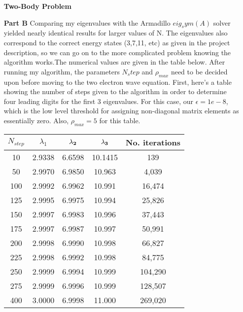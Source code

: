 \documentclass[11pt,a4wide]{article}
\begin{document}
\newpage
\begin{enumerate}
\item[\bf Two-Body Problem]

\item[\bf Part B]
Comparing my eigenvalues with the Armadillo $eig_sym(A)$ solver yielded nearly identical results for larger values of N. The eigenvalues also correspond to the correct energy states (3,7,11, etc) as given in the project description, so we can go on to the more complicated problem knowing the algorithm works.The numerical values are given in the table below. \newline
After running my algorithm, the parameters $N_step$ and $\rho_{max}$ need to be decided upon before moving to the two electron wave equation. First, here's a table showing the number of steps given to the algorithm in order to determine four leading digits for the first 3 eigenvalues. For this case, our $\epsilon = 1e-8$, which is the low level threshold for assigning non-diagonal matrix elements as essentially zero. Also, $\rho_{max} = 5$ for this table.  
\begin{center}
    \begin{tabular}{| c | c | c | c | c |}
    \hline
    \bf$ N_{step}$	& \bf $\lambda_{1}$	 & $\bf \lambda_{2}$	 & $\bf \lambda_{3}$	 & 	\bf No. iterations \\ \hline
	10 & 2.9338	 & 6.6598 &  10.1415 & 139 \\ \hline
	50 & 2.9970  & 6.9850  & 10.963 & 4,039 \\ \hline
	100 & 2.9992 & 6.9962 & 10.991 & 16,474 \\ \hline
	125 & 2.9995 & 6.9975 & 10.994 & 25,826 \\ \hline
	150 & 2.9997 & 6.9983  & 10.996 & 37,443 \\ \hline
	175 & 2.9997 & 6.9987 	& 10.997 & 50,991 \\ \hline
	200 & 2.9998 & 6.9990 	& 10.998 & 66,827 \\ \hline
	225 & 2.9998 & 6.9992	& 10.998 & 84,775 \\ \hline
	250 & 2.9999 & 6.9994 	& 10.999 & 104,290 \\ \hline
	275 & 2.9999 & 6.9996 	& 10.999 & 128,507 \\ \hline
	400 & 3.0000 & 6.9998 	& 11.000 & 269,020 \\ 
	 \hline	
    \end{tabular}
\end{center}


\end{enumerate}
\end{document}
